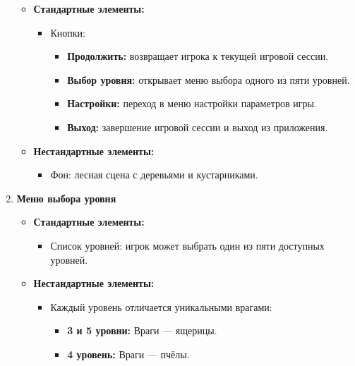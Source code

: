 \documentclass{article}
\begin{document}
\begin{enumerate}
    \begin{itemize}
        \item \textbf{Стандартные элементы:}
        \begin{itemize}
            \item Кнопки:
            \begin{itemize}
                \item \textbf{Продолжить:} возвращает игрока к текущей игровой сессии.
                \item \textbf{Выбор уровня:} открывает меню выбора одного из пяти уровней.
                \item \textbf{Настройки:} переход в меню настройки параметров игры.
                \item \textbf{Выход:} завершение игровой сессии и выход из приложения.
            \end{itemize}
        \end{itemize}
        \item \textbf{Нестандартные элементы:}
        \begin{itemize}
            \item Фон: лесная сцена с деревьями и кустарниками.
        \end{itemize}
    \end{itemize}
    
    \item \textbf{Меню выбора уровня}
    \begin{itemize}
        \item \textbf{Стандартные элементы:}
        \begin{itemize}
            \item Список уровней: игрок может выбрать один из пяти доступных уровней.
        \end{itemize}
        \item \textbf{Нестандартные элементы:}
        \begin{itemize}
            \item Каждый уровень отличается уникальными врагами:
            \begin{itemize}
                \item \textbf{3 и 5 уровни:} Враги — ящерицы.
                \item \textbf{4 уровень:} Враги — пчёлы.
            \end{itemize}
        \end{itemize}
    \end{itemize}
\end{enumerate}
\end{document}
